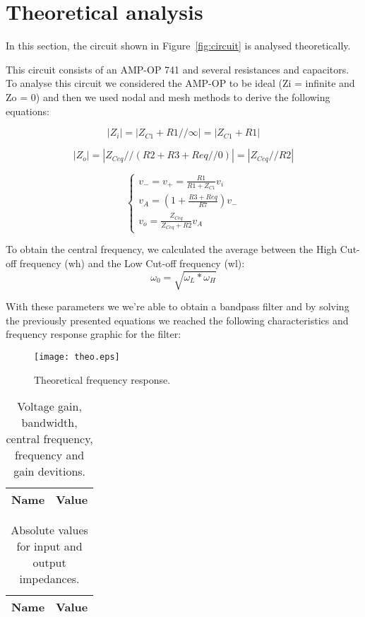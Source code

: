 \section{Theoretical analysis}

\label{sec:analysis}

\tab In this section, the circuit shown in Figure~\ref{fig:circuit} is analysed theoretically.

This circuit consists of an AMP-OP 741 and several resistances and capacitors. To analyse this circuit we considered the AMP-OP to be ideal (Zi = infinite and Zo = 0) and then we used nodal and mesh methods to derive the following equations:

\begin{equation}
\left|Z_{i}\right|=\left|Z_{C 1}+R 1 / / \infty\right|=\left|Z_{C 1}+R 1\right|
\end{equation}

\begin{equation}
\left|Z_{o}\right|=\left|Z_{Ceq} / /(R 2+R 3+Req/ / 0)\right|=\left|Z_{Ceq} / / R 2\right|
\end{equation}

\begin{equation}
\left\{\begin{array}{l}
v_{-}=v_{+}=\frac{R 1}{R 1+Z_{C 1}} v_{i} \\
v_{A}=\left(1+\frac{R 3 + Req}{R 7}\right) v_{-} \\
v_{o}=\frac{Z_{Ceq}}{Z_{Ceq}+R 2} v_{A}
\end{array}\right.
\end{equation}

To obtain the central frequency, we calculated the average between the High Cut-off frequency (wh) and the Low Cut-off frequency (wl):
\begin{equation}
\omega_{0}=\sqrt{\omega_{L} * \omega_{H}}
\end{equation}

With these parameters we we're able to obtain a bandpass filter and by solving the previously presented equations we reached the following characteristics and frequency response graphic for the filter:


\begin{figure}[H] \centering
    \texttt{[image: theo.eps]}
    \caption{Theoretical frequency response.}
    \label{fig:theo1}
\end{figure}

\begin{table}[H]
    \centering
    \begin{tabular}{|l|r|}
    \hline
    {\bf Name} & {\bf Value} \\ \hline
   
    \end{tabular}
    \caption{Voltage gain, bandwidth, central frequency, frequency and gain devitions.}
    \label{tab:theo1}
\end{table}


\begin{table}[H]
    \centering
    \begin{tabular}{|l|r|}
    \hline
    {\bf Name} & {\bf Value} \\ \hline
   
    \end{tabular}
    \caption{Absolute values for input and output impedances.}
    \label{tab:theo2}
\end{table}
